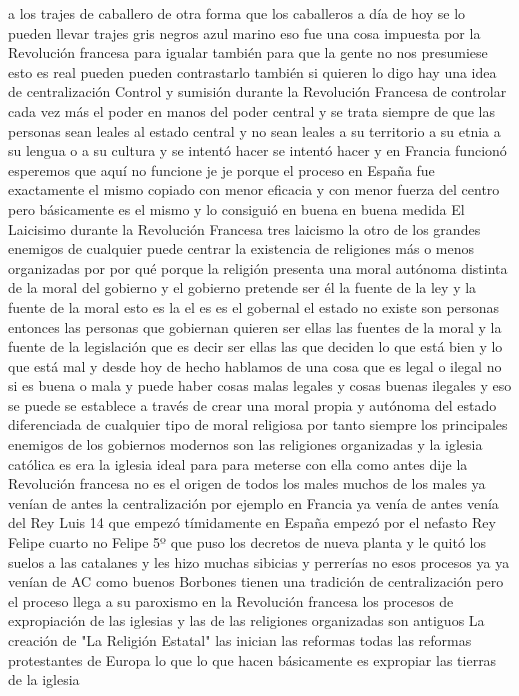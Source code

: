 a los trajes de caballero de otra forma que los caballeros a día de hoy se lo pueden llevar trajes gris negros azul marino
eso fue una cosa impuesta por la Revolución francesa para igualar también para que la gente no nos presumiese esto es real
pueden pueden contrastarlo también si quieren lo digo hay una idea de centralización
Control y sumisión durante la Revolución Francesa
de controlar cada vez más el poder en manos del poder central
y se trata siempre de que las personas sean leales al estado central y no sean leales a su territorio
a su etnia a su lengua o a su cultura y se intentó hacer
se intentó hacer y en Francia funcionó esperemos que aquí no funcione je je
porque el proceso en España fue exactamente el mismo copiado con menor eficacia y con menor fuerza del centro
pero básicamente es el mismo y lo consiguió en buena en buena medida
El Laicisimo durante la Revolución Francesa
tres laicismo la
otro de los grandes enemigos de cualquier puede centrar la existencia de religiones más o menos organizadas
por por qué porque la religión presenta una moral autónoma distinta de la moral del gobierno
y el gobierno pretende ser él la fuente de la ley y la fuente de la moral esto es la el es es el gobernal
el estado no existe son personas entonces las personas que gobiernan quieren ser ellas las fuentes de la moral
y la fuente de la legislación que es decir ser ellas las que deciden lo que está bien y lo que está mal y desde hoy
de hecho hablamos de una cosa que es legal o ilegal no si es buena o mala y puede haber cosas malas legales y cosas buenas
ilegales y eso se puede se establece a través de crear una moral propia y autónoma del estado
diferenciada de cualquier tipo de moral religiosa por tanto siempre los principales enemigos de los gobiernos modernos
son las religiones organizadas y la iglesia católica es era la iglesia ideal para para meterse con ella
como antes dije la Revolución francesa no es el origen de todos los males muchos de los males ya venían de antes
la centralización por ejemplo en Francia ya venía de antes venía del Rey Luis 14 que empezó tímidamente en España empezó
por el nefasto Rey Felipe cuarto no Felipe 5º
que puso los decretos de nueva planta y le quitó los suelos a las catalanes y les hizo muchas sibicias y perrerías
no esos procesos ya ya venían de AC como buenos Borbones tienen una tradición de centralización pero el proceso llega a su paroxismo
en la Revolución francesa los procesos de expropiación de las iglesias y las de las religiones organizadas son antiguos
La creación de "La Religión Estatal"
las inician las reformas todas las reformas protestantes de Europa lo que lo que hacen básicamente es expropiar las tierras de la iglesia
